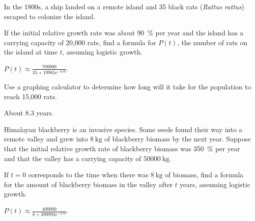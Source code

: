 \begin{exercises}
			
\begin{problem}[Rats!]
In the 1800s, a ship landed on a remote island and 35 black rats (\textit{Rattus rattus}) escaped to colonize the island.  
\begin{subproblem} \label{exp:prob:ratisland}
	If the initial relative growth rate was about \SI{90}{\percent} per year and the island has a carrying capacity of 20,000 rats, find a formula for $P(t)$, the number of rats on the island at time $t$, assuming logistic growth.
	\begin{shortsolution}
		$P(t)\approx\frac{700000}{35+19965e^{-0.9t}}$.
	\end{shortsolution}
\end{subproblem}
\begin{subproblem}
	Use a graphing calculator to determine
	how long will it take for the population to reach 15,000 rats.  
	\begin{shortsolution}
		About 8.3 years.
	\end{shortsolution}
\end{subproblem}
\end{problem}
			
\begin{problem}
Himalayan blackberry is an invasive species.  
Some seeds found their way into a remote valley and grew into $\SI{8}{\kilo\gram}$ of blackberry biomass by the next year.  
Suppose that the initial relative growth rate of blackberry biomass was \SI{350}{\percent} per year and that the valley has a carrying capacity of $\SI{50000}{\kilo\gram}$.  
\begin{subproblem} \label{exp:prob:blackberries}
	If $t=0$ corresponds to the time when there was $\SI{8}{\kilo\gram}$ of biomass, find a formula for the amount of 
	blackberry biomass in the valley after $t$ years, assuming logistic growth.  
	\begin{shortsolution}
		$P(t)\approx\frac{400000}{8+399992e^{-3.5t}}$.
	\end{shortsolution}
\end{subproblem}
			

\end{problem}
\end{exercises}
